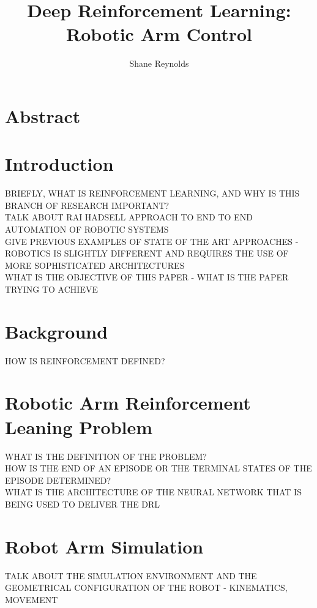 \documentclass[a4paper]{article}
\begin{document}
\title{Deep Reinforcement Learning: Robotic Arm Control}
\author{Shane Reynolds}
\maketitle

\section*{Abstract}



\section{Introduction}
BRIEFLY, WHAT IS REINFORCEMENT LEARNING, AND WHY IS THIS BRANCH OF RESEARCH IMPORTANT?\\

TALK ABOUT RAI HADSELL APPROACH TO END TO END AUTOMATION OF ROBOTIC SYSTEMS\\

GIVE PREVIOUS EXAMPLES OF STATE OF THE ART APPROACHES - ROBOTICS IS SLIGHTLY DIFFERENT AND REQUIRES THE USE OF MORE SOPHISTICATED ARCHITECTURES\\

WHAT IS THE OBJECTIVE OF THIS PAPER - WHAT IS THE PAPER TRYING TO ACHIEVE



\section{Background}
HOW IS REINFORCEMENT DEFINED?\\



\section{Robotic Arm Reinforcement Leaning Problem}
WHAT IS THE DEFINITION OF THE PROBLEM?\\

HOW IS THE END OF AN EPISODE OR THE TERMINAL STATES OF THE EPISODE DETERMINED?\\

WHAT IS THE ARCHITECTURE OF THE NEURAL NETWORK THAT IS BEING USED TO DELIVER THE DRL\\



\section{Robot Arm Simulation}
TALK ABOUT THE SIMULATION ENVIRONMENT AND THE GEOMETRICAL CONFIGURATION OF THE ROBOT - KINEMATICS, MOVEMENT\\
\end{document}
